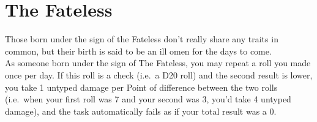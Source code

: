 \section{The Fateless}\label{zodiac:fateless}

Those born under the sign of the Fateless don't really share any traits in common, but their birth is said to be an ill omen for the days to come.\\
As someone born under the sign of The Fateless, you may repeat a roll you made once per day.
If this roll is a check (i.e.\ a D20 roll) and the second result is lower, you take 1 untyped damage per Point of difference between the two rolls (i.e.\ when your first roll was 7 and your second was 3, you'd take 4 untyped damage), and the task automatically fails as if your total result was a 0.\\